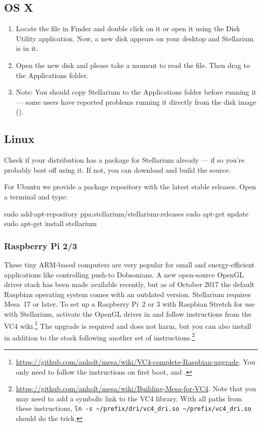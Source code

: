 \subsection{OS X}
\label{sec:GettingStarted:Installation:OSX}

\begin{enumerate}
\item
  Locate the  file in
  Finder and double click on it or open it using the Disk Utility
  application. Now, a new disk appears on your desktop and Stellarium is
  in it.
\item
  Open the new disk and please take a moment to read the  file.
  Then drag  to the Applications folder.
\item
  Note: You should copy Stellarium to the Applications folder before
  running it --- some users have reported problems running it directly
  from the disk image ().
\end{enumerate}

\subsection{Linux}
\label{sec:GettingStarted:Installation:Linux}

Check if your distribution has a package for Stellarium already --- if
so you're probably best off using it. If not, you can download and build
the source.

For Ubuntu we provide a package repository with the latest stable
releases. Open a terminal and type:

\begin{commands}
sudo add-apt-repository ppa:stellarium/stellarium-releases
sudo apt-get update
sudo apt-get install stellarium
\end{commands}

\subsubsection{Raspberry Pi 2/3}
These tiny ARM-based computers are very popular for small and energy-efficient applications like controlling push-to Dobsonians. 
A new open-source OpenGL driver stack has been made available recently, but as of October 2017 the default 
Raspbian operating system comes with an outdated version. Stellarium requires Mesa~17 or later. 
To set up a Raspberry Pi~2 or 3 with Raspbian Stretch for use with Stellarium, activate the OpenGL driver in 
 and follow instructions from the VC4 wiki.\footnote{%
	\url{https://github.com/anholt/mesa/wiki/VC4-complete-Raspbian-upgrade}. You only need to follow the instructions on first boot,  and .} 
The  upgrade is required and does not harm, but you can also install  in addition to the stock  
following another set of instructions.\footnote{\url{https://github.com/anholt/mesa/wiki/Building-Mesa-for-VC4}. 
	Note that you may need to add a symbolic link to the VC4 library. With all paths from these instructions, 
	\verb|ln -s ~/prefix/dri/vc4_dri.so ~/prefix/vc4_dri.so| should do the trick.}

